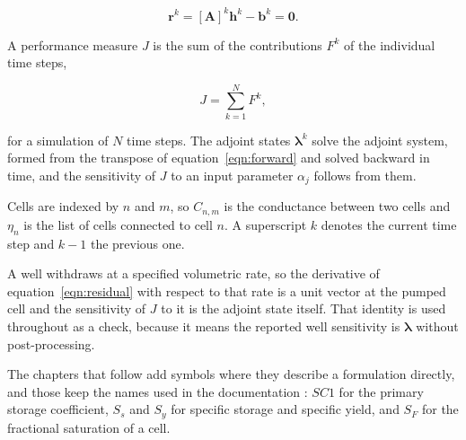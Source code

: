 \begin{equation}
	\label{eqn:residual}
	\mathbf{r}^{k} = \left[ \mathbf{A} \right]^{k} \mathbf{h}^{k}
	- \mathbf{b}^{k} = \mathbf{0}.
\end{equation}

A performance measure $J$ is the sum of the contributions $F^{k}$ of the
individual time steps,

\begin{equation}
	\label{eqn:pm}
	J = \sum_{k=1}^{N} F^{k},
\end{equation}

\noindent for a simulation of $N$ time steps. The adjoint states
$\bm{\lambda}^{k}$ solve the adjoint system, formed from the transpose of
equation~\ref{eqn:forward} and solved backward in time, and the sensitivity of
$J$ to an input parameter $\alpha_{j}$ follows from them.

Cells are indexed by $n$ and $m$, so $C_{n,m}$ is the conductance between two
cells and $\eta_{n}$ is the list of cells connected to cell $n$. A superscript
$k$ denotes the current time step and $k-1$ the previous one.

A well withdraws at a specified volumetric rate, so the derivative of
equation~\ref{eqn:residual} with respect to that rate is a unit vector at the
pumped cell and the sensitivity of $J$ to it is the adjoint state itself. That
identity is used throughout as a check, because it means the reported well
sensitivity is $\bm{\lambda}$ without post-processing.

The chapters that follow add symbols where they describe a \mf{} formulation
directly, and those keep the names used in the \mf{} documentation
\citep{langevin2024supp}: $SC1$ for the primary storage coefficient, $S_s$ and
$S_y$ for specific storage and specific yield, and $S_F$ for the fractional
saturation of a cell.
